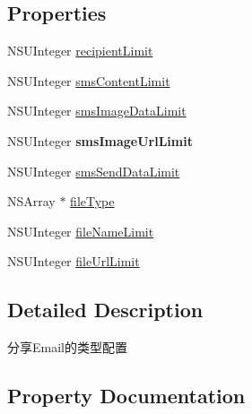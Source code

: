 \subsection*{Properties}
\begin{DoxyCompactItemize}
\item 
N\+S\+U\+Integer \mbox{\hyperlink{interface_u_m_social_share_sms_object_config_a9e41256671a3df185fa39c1fecb2803a}{recipient\+Limit}}
\item 
N\+S\+U\+Integer \mbox{\hyperlink{interface_u_m_social_share_sms_object_config_ad45c9c32f8b8f5d49f5f943694d6e4ce}{sms\+Content\+Limit}}
\item 
N\+S\+U\+Integer \mbox{\hyperlink{interface_u_m_social_share_sms_object_config_a6b29a34f2e3623a1828fe96bb70118d1}{sms\+Image\+Data\+Limit}}
\item 
\mbox{\label{interface_u_m_social_share_sms_object_config_ad2789b0adb9a7c8e4a9a0a6537e7e0e9}} 
N\+S\+U\+Integer {\bfseries sms\+Image\+Url\+Limit}
\item 
N\+S\+U\+Integer \mbox{\hyperlink{interface_u_m_social_share_sms_object_config_a8ebf43a132b59bf4ae5c5772a433e513}{sms\+Send\+Data\+Limit}}
\item 
N\+S\+Array $\ast$ \mbox{\hyperlink{interface_u_m_social_share_sms_object_config_a8f083ca4e81af1d25b2a05d5c7155012}{file\+Type}}
\item 
N\+S\+U\+Integer \mbox{\hyperlink{interface_u_m_social_share_sms_object_config_a5c7665fef88f20817ba5a55378dffa1b}{file\+Name\+Limit}}
\item 
N\+S\+U\+Integer \mbox{\hyperlink{interface_u_m_social_share_sms_object_config_a426ebaaeaeb7016c2df3e98e582fec07}{file\+Url\+Limit}}
\end{DoxyCompactItemize}


\subsection{Detailed Description}
分享\+Email的类型配置 

\subsection{Property Documentation}
\mbox{\label{interface_u_m_social_share_sms_object_config_a5c7665fef88f20817ba5a55378dffa1b}} 
